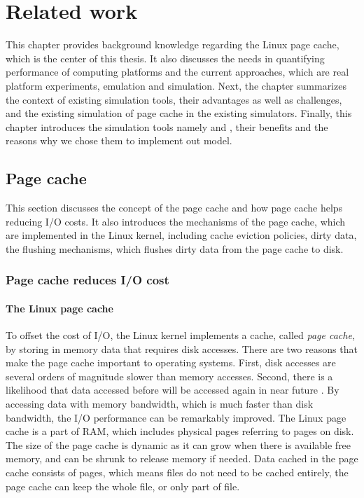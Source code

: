 \chapter{Related work}
\label{relatedwork}

This chapter provides background knowledge regarding the Linux page cache, 
which is the center of this thesis. 
It also discusses the needs in quantifying performance of computing platforms 
and the current approaches, which are real platform experiments, 
emulation and simulation.
Next, the chapter summarizes the context of existing simulation tools, their 
advantages as well as challenges, and the existing simulation of page cache in the 
existing simulators. 
Finally, this chapter introduces the simulation tools namely \simgrid and \wrench, 
their benefits and the reasons why we chose them to implement out model. 

\section{Page cache}

This section discusses the concept of the page cache and how page cache 
helps reducing I/O costs.
It also introduces the mechanisms of the page cache, which are implemented 
in the Linux kernel, including cache eviction policies, dirty data, the flushing 
mechanisms, which flushes dirty data from the page cache to disk. 

\subsection{Page cache reduces I/O cost}

\subsubsection{The Linux page cache}

To offset the cost of I/O, the Linux kernel implements a cache, 
called \textit{page cache}, by storing in memory data that requires 
disk accesses. 
There are two reasons that make the page cache important to 
operating systems. 
First, disk accesses are several orders of magnitude slower than 
memory accesses. 
Second, there is a likelihood that data accessed before will be accessed 
again in near future \cite{linuxdev3rd2010}. 
By accessing data with memory bandwidth, which is much faster than disk 
bandwidth, the I/O performance can be remarkably improved. 
The Linux page cache is a part of RAM, which includes physical pages 
referring to pages on disk. 
The size of the page cache is dynamic as it can grow when there is 
available free memory, and can be shrunk to release memory if needed. 
Data cached in the page cache consists of pages, which means files 
do not need to be cached entirely, the page cache can keep the whole file, 
or only part of file. 

